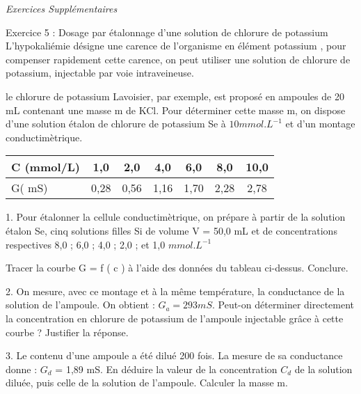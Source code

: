\documentclass[12pt, french]{article}
\begin{document}
\vspace{3cm}
\begin{center}
   \Large{ \em{Exercices Supplémentaires}}
\end{center}
\begin{Box2}{Exercice 5 : Dosage par étalonnage d'une solution de chlorure de potassium }
L’hypokaliémie désigne une carence de l’organisme en élément potassium ,  pour compenser rapidement cette 
   carence, on peut utiliser une solution de chlorure de potassium, injectable par voie intraveineuse. 
   
le chlorure de potassium Lavoisier, par exemple, est proposé en ampoules de 20 mL contenant une  masse m  de KCl. Pour déterminer cette masse m, on dispose d’une solution étalon de chlorure de potassium Se à 
   $10 mmol.L^{-1}$ et d’un montage conductimètrique.

\begin{center}
\begin{tabular}{ |l|c|c|c|c|c|c| }
\hline
   C (mmol/L)  & 1,0  & 2,0  & 4,0  & 6,0  & 8,0  & 10,0 \\ \hline

   {G( mS) }   & 0,28 & 0,56 & 1,16 & 1,70 & 2,28 & 2,78 \\

\hline
\end{tabular}
\end{center}

1. Pour étalonner la cellule conductimètrique, on prépare à partir de la solution étalon Se, cinq
solutions filles Si de volume V = 50,0 mL et de concentrations respectives 8,0 ; 6,0 ; 4,0 ; 2,0 ; et 1,0
   $mmol.L^{-1}$

   Tracer la courbe G = f ( c ) à l’aide des données du tableau ci-dessus. Conclure.

2. On mesure, avec ce montage et à la même température, la conductance de la solution de l’ampoule.
On obtient : $G_a = 293 mS$. Peut-on déterminer directement la concentration en chlorure de potassium de
l’ampoule injectable grâce à cette courbe ? Justifier la réponse.

3. Le contenu d’une ampoule a été dilué 200 fois. La mesure de sa conductance donne : $G_d$ = 1,89 mS.
En déduire la valeur de la concentration $C_d$ de la solution diluée, puis celle de la solution de l’ampoule.
Calculer la masse m.

\end{Box2}
\end{document}
